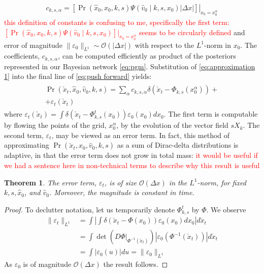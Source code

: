 \documentclass[letterpaper,10pt,conference]{ieeeconf}
\newtheorem{thm}{Theorem}
\newcommand{\Ram}[1]{\textcolor{red}{#1}}
\begin{document}
\begin{align}
	c_{k,s,\alpha} =  \left. \left[ \Pr(\hat{x}_0, x_0, k, s) \Psi( \hat{v}_0 \mid k,s,x_0 )  | \Delta x | \right] \right|_{x_0 = x_0^\alpha} \label{eq:constants}
\end{align}
\Ram{this definition of constants is confusing to me, specifically the first term: $ \left[ \Pr(\hat{x}_0, x_0, k, s) \Psi( \hat{v}_0 \mid k,s,x_0 ) \right] |_{x_0 = x_0^\alpha}$ seems to be circularly defined }
and error of magnitude $\| \varepsilon_0 \|_{L^1} \sim \mathcal{O}( | \Delta x | )$ with respect to the $L^1$-norm in $x_0$.
The coefficients, $c_{k,s,\alpha}$, can be computed efficiently as product of the posteriors represented in our Bayesian network \eqref{eq:pgm}.
Substitution of \eqref{eq:approximation 1} into the final line of \eqref{eq:push forward} yields:
\begin{align}
\begin{split}
	\Pr( \check{x}_t , \hat{x}_0, \hat{v}_0, k,s) = \sum_\alpha c_{k,s,\alpha} \delta \left( \check{x}_t - \Phi_{k,s}( x_0^\alpha) \right) + \\ + \varepsilon_t( \check{x}_t)
	\end{split}
\end{align}
where $\varepsilon_t( \check{x}_t) = \int \delta\left( \check{x}_t - \Phi_{k,s}^{t}( x_0) \right)  \varepsilon_0(x_0) dx_0$.
The first term is computable by flowing the points of the grid, $x_0^\alpha$, by the evolution of the vector field $s X_k$.
The second term, $\varepsilon_t$, may be viewed as an error term.
In fact, this method of approximating $\Pr( \check{x}_t , \hat{x}_0, \hat{v}_0, k,s)$ as a sum of Dirac-delta distributions is adaptive, in that the error term does not grow in total mass:
\Ram{it would be useful if we had a sentence here in non-technical terms to describe why this result is useful}

\begin{thm} \label{thm:error}
	The error term, $\varepsilon_t$, is of size $\mathcal{O}( \Delta x)$ in the $L^1$-norm, for fixed $k,s,\hat{x}_0$, and $\hat{v}_0$.
	Moreover, the magnitude is constant in time.
\end{thm}
\begin{proof}
	To declutter notation, let us temporarily denote $\Phi_{k,s}^t$ by $\Phi$.
	We observe
\begin{align*}
	\| \varepsilon_t \|_{L^1} &= \int \left| \int \delta( \check{x}_t - \Phi(x_0) ) \varepsilon_0(x_0) dx_0 \right| d\check{x}_t \\
	&= \int \det( \left. D\Phi \right|_{\Phi^{-1}( \check{x}_t) }) |\varepsilon_{0}( \Phi^{-1}( \check{x}_t )) | d\check{x}_t \\
	&= \int | \varepsilon_0( u) | du = \| \varepsilon_0 \|_{L^1}
\end{align*}
As $\varepsilon_0$ is of magnitude $\mathcal{O}( \Delta x)$ the result follows.
\end{proof}
\end{document}
